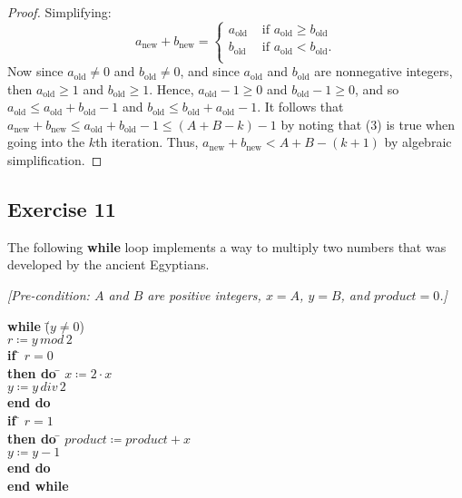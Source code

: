 \documentclass[14pt]{extarticle}
\begin{document}
\begin{proof}
    Simplifying:
    \[
        a_{\text{new}} + b_{\text{new}} =
        \left\{
        \begin{array}{lr}
            a_{\text{old}} & \text{ if } a_{\text{old}} \geq b_{\text{old}} \\
            b_{\text{old}} & \text{ if } a_{\text{old}} < b_{\text{old}}.   \\
        \end{array}
        \right.
    \]
    Now since $a_{\text{old}} \neq 0$ and $b_{\text{old}} \neq 0$, and since $a_{\text{old}}$ and $b_{\text{old}}$ are nonnegative integers, then $a_{\text{old}} \geq 1$ and $b_{\text{old}} \geq 1$. Hence, $a_{\text{old}} - 1 \geq 0$ and $b_{\text{old}} - 1 \geq 0$, and so $a_{\text{old}} \leq a_{\text{old}} + b_{\text{old}} - 1$ and $b_{\text{old}} \leq b_{\text{old}} + a_{\text{old}} - 1$. It follows that $a_{\text{new}} + b_{\text{new}} \leq a_{\text{old}} + b_{\text{old}} - 1 \leq (A + B - k) - 1$ by noting that (3) is true when going into the $k$th iteration. Thus, $a_{\text{new}} + b_{\text{new}} < A + B - (k + 1)$ by algebraic simplification.
\end{proof}

\subsection{Exercise 11}
The following {\bf while} loop implements a way to multiply two numbers that was developed by the ancient Egyptians.

    {\it [Pre-condition: $A$ and $B$ are positive integers, $x = A$,  $y = B$, and $product = 0$.]}

\begin{tabbing}
    {\bf while} \= ($y \neq 0$) \\
    \> $r \coloneqq y \, mod \, 2$ \\
    \> {\bf if} \= $r = 0$ \\
    \>          \> {\bf then do} \= $x \coloneqq 2 \cdot x$ \\
    \>          \>               \> $y \coloneqq y \, div \, 2$ \\
    \>          \>               \> {\bf end do} \\
    \> {\bf if} \= $r = 1$ \\
    \>          \> {\bf then do} \= $product \coloneqq product + x$ \\
    \>          \>               \> $y \coloneqq y - 1$ \\
    \>          \>               \> {\bf end do} \\
    {\bf end while}
\end{tabbing}
\end{document}
